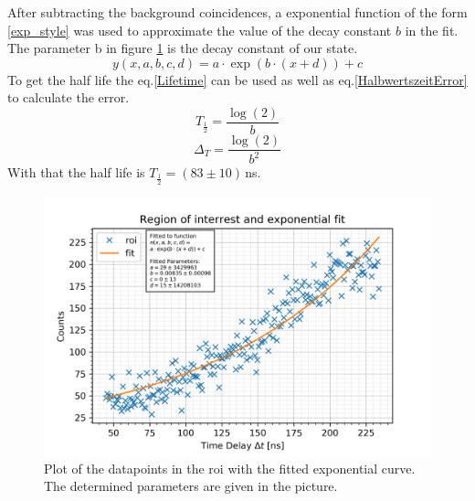 \documentclass[30pt,a4paper]{article}
\begin{document}
 	\FloatBarrier
 	After subtracting the background coincidences, a exponential function of the form
 	\ref{exp_style} was used to approximate the value of the decay constant $b$ in the fit. The parameter b in figure \ref{exp_fit} is the decay constant of our state. 
 	\begin{equation}
 	y\left(x,a,b,c,d\right) = a \cdot \exp\left(b\cdot\left(x+d\right)\right) + c
 	\label{exp_style}
 	\end{equation}
 	To get the half life the eq.\ref{Lifetime} can be used as well as eq.\ref{HalbwertszeitError} to calculate the error.
 	\begin{equation}
 	T_\frac{1}{2}=\frac{\log(2)}{b}
 	\label{Lifetime} 
 	\end{equation}
 	\begin{equation}
 	\Delta_T=\frac{\log(2)}{b^2}
 	\label{HalbwertszeitError} 
 	\end{equation}
 	With that the half life is $T_\frac{1}{2}=(83\pm10)$\,ns.
 	\begin{figure}[h]
 		\includegraphics{Bilder/lin_fit_exp}
 		\centering
 		\caption{\small Plot of the datapoints in the roi with the fitted exponential curve. The determined parameters are given in the picture.}
 		\label{exp_fit}
 	\end{figure}
 	
 	\FloatBarrier
 	
 	
\end{document}
